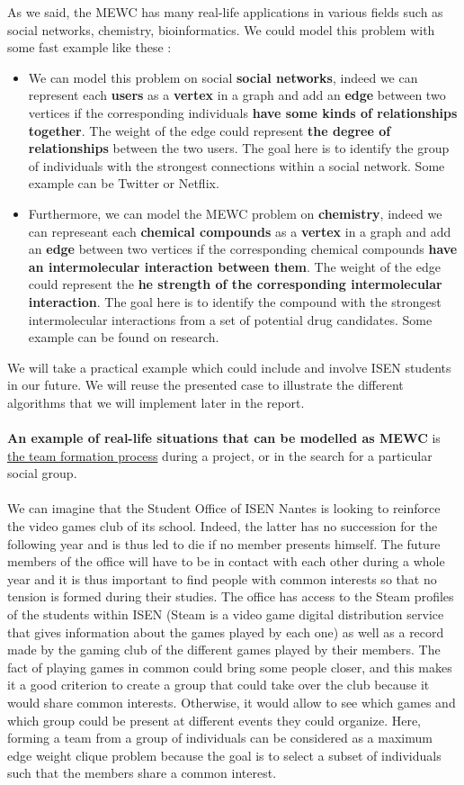 As we said, the MEWC has many real-life applications in various fields such as social networks, chemistry, bioinformatics. We could model this problem with some fast example like these :
\begin{itemize}
    \item We can model this problem on social \textbf{social networks}, indeed we can represent each \textbf{users} as a \textbf{vertex} in a graph and add an \textbf{edge} between two vertices if the corresponding individuals \textbf{have some kinds of relationships together}. The weight of the edge could represent \textbf{the degree of relationships} between the two users. The goal here is to identify the group of individuals with the strongest connections within a social network. Some example can be Twitter or Netflix.
    \item Furthermore, we can model the MEWC problem on \textbf{chemistry}, indeed we can represeant each \textbf{chemical compounds} as a \textbf{vertex} in a graph and add an \textbf{edge} between two vertices if the corresponding chemical compounds \textbf{have an intermolecular interaction between them}. The weight of the edge could represent the \textbf{he strength of the corresponding intermolecular interaction}. The goal here is to identify the compound with the strongest intermolecular interactions from a set of potential drug candidates. Some example can be found on research.
\end{itemize}
We will take a practical example which could include and involve ISEN students in our future. We will reuse the presented case to illustrate the different algorithms that we will implement later in the report.\\ \\
\textbf{An example of real-life situations that can be modelled as MEWC} is \ul{the team formation process} during a project, or in the search for a particular social group.
\\ \\
We can imagine that the Student Office of ISEN Nantes is looking to reinforce the video games club of its school. Indeed, the latter has no succession for the following year and is thus led to die if no member presents himself. The future members of the office will have to be in contact with each other during a whole year and it is thus important to find people with common interests so that no tension is formed during their studies. The office has access to the Steam profiles of the students within ISEN (Steam is a video game digital distribution service that gives information about the games played by each one) as well as a record made by the gaming club of the different games played by their members. The fact of playing games in common could bring some people closer, and this makes it a good criterion to create a group that could take over the club because it would share common interests. Otherwise, it would allow to see which games and which group could be present at different events they could organize. Here, forming a team from a group of individuals can be considered as a maximum edge weight clique problem because the goal is to select a subset of individuals such that the members share a common interest.
